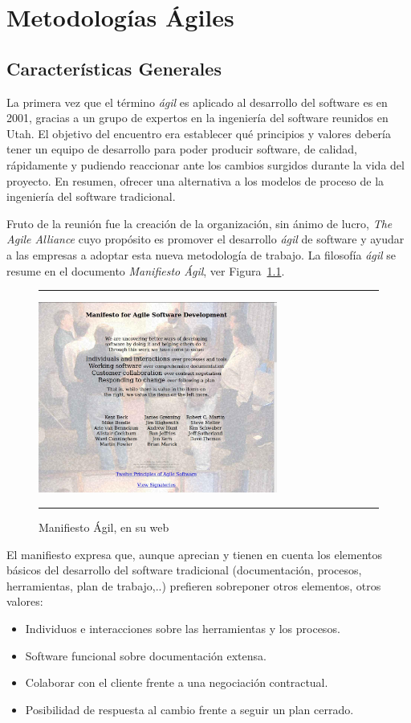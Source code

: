\chapter{Metodologías Ágiles}
\label{ch:agil}

\section{Características Generales}
\label{sec:caracteristicas}
La primera vez que el término \emph{ágil} es aplicado al desarrollo del
software es en 2001, gracias a un grupo de expertos en la ingeniería
del software reunidos en Utah. El objetivo del encuentro era
establecer qué principios y valores debería tener un equipo de
desarrollo para poder producir software, de calidad, rápidamente y
pudiendo reaccionar ante los cambios surgidos durante la vida del
proyecto. En resumen, ofrecer una alternativa a los modelos de proceso
de la ingeniería del software tradicional.

Fruto de la reunión fue la creación de la organización, sin ánimo de
lucro, \emph{The Agile Alliance} cuyo propósito es promover el desarrollo
\emph{ágil} de software y ayudar a las empresas a adoptar esta nueva
metodología de trabajo. La filosofía \emph{ágil} se resume en el documento
\emph{Manifiesto Ágil}, ver Figura~\ref{fig:manifiesto}.

\begin{figure}[h]
\hrule\smallskip
\begin{center}
\includegraphics[width=0.7\textwidth]{fig/manifiesto.jpg}
\end{center}
\caption{Manifiesto Ágil, en su web}
\label{fig:manifiesto}
\hrule
\end{figure}

El manifiesto expresa que, aunque aprecian y tienen en cuenta los
elementos básicos del desarrollo del software tradicional
(documentación, procesos, herramientas, plan de trabajo,..) prefieren
sobreponer otros elementos, otros valores:
\begin{itemize}
\item Individuos e interacciones sobre las herramientas y los
  procesos.
\item Software funcional sobre documentación extensa.
\item Colaborar con el cliente frente a una negociación contractual.
\item Posibilidad de respuesta al cambio frente a seguir un plan
  cerrado.
\end{itemize}

